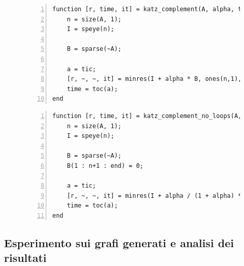 \documentclass[a4paper]{article}
\newcommand{\evec}{{\bf e}}
\newcommand{\xvec}{{\bf x}}
\begin{document}
\begin{figure}[H]
    \centering
    \begin{lstlisting}[style=Matlab-editor, frame=single, numbers=left, caption={Contenuto del file \texttt{katz\_complement.m}. La funzione calcola la matrice di adiacenza complementare \textit{con lacci} $B$ di $A$ e risolve iterativamente col metodo MINRES il sistema $(I + \alpha B) \xvec = \evec$, in accordo al Teorema \ref{th:compl_1}. I valori restituiti sono il vettore di Katz (\texttt{r}), il tempo impiegato per eseguire il metodo MINRES (\texttt{time}) e il numero di iterazioni del suddetto metodo (\texttt{it}).}, captionpos=b, label=code:katz_complement]
function [r, time, it] = katz_complement(A, alpha, tol, maxit)
    n = size(A, 1);
    I = speye(n);
    
    B = sparse(~A);
    
    a = tic;
    [r, ~, ~, it] = minres(I + alpha * B, ones(n,1), tol, maxit);
    time = toc(a);
end       
    \end{lstlisting}
\end{figure}

\begin{figure}[H]
    \centering
    \begin{lstlisting}[style=Matlab-editor, frame=single, numbers=left, caption={Contenuto del file \texttt{katz\_complement\_no\_loops.m}. La funzione calcola la matrice di adiacenza complementare \textit{senza lacci} $B$ di $A$ e risolve iterativamente col metodo MINRES il sistema $\left(I + \frac{\alpha}{1 + \alpha} B\right) \xvec = \evec$, in accordo al Teorema \ref{th:compl_2}. I valori restituiti sono il vettore di Katz (\texttt{r}), il tempo impiegato per eseguire il metodo MINRES (\texttt{time}) e il numero di iterazioni del suddetto metodo (\texttt{it}).}, captionpos=b, label=code:katz_complement_no_loops]
function [r, time, it] = katz_complement_no_loops(A, alpha, tol, maxit)
    n = size(A, 1);
    I = speye(n);
    
    B = sparse(~A);
    B(1 : n+1 : end) = 0;
    
    a = tic;
    [r, ~, ~, it] = minres(I + alpha / (1 + alpha) * B, ones(n,1), tol, maxit);
    time = toc(a);
end       
    \end{lstlisting}
\end{figure}

\subsection{Esperimento sui grafi generati e analisi dei risultati}
\end{document}
